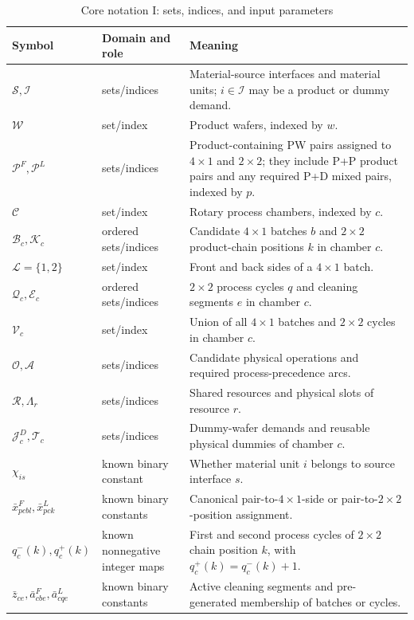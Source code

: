 \documentclass[final,5p,times,twocolumn]{elsarticle}
\begin{document}
\begin{table}[t]
\centering
\scriptsize
\setlength{\tabcolsep}{2.5pt}
\caption{Core notation I: sets, indices, and input parameters}
\label{tab:symbol-en-a}
\begin{tabular}{p{}p{}p{}}
\toprule
Symbol & Domain and role & Meaning \\
\midrule
$\mathcal S,\mathcal I$ & sets/indices & Material-source interfaces and material units; $i\in\mathcal I$ may be a product or dummy demand.\\
$\mathcal W$ & set/index & Product wafers, indexed by $w$.\\
$\mathcal P^F,\mathcal P^L$ & sets/indices & Product-containing PW pairs assigned to $4\times1$ and $2\times2$; they include P+P product pairs and any required P+D mixed pairs, indexed by $p$.\\
$\mathcal C$ & set/index & Rotary process chambers, indexed by $c$.\\
$\mathcal B_c,\mathcal K_c$ & ordered sets/indices & Candidate $4\times1$ batches $b$ and $2\times2$ product-chain positions $k$ in chamber $c$.\\
$\mathcal L=\{1,2\}$ & set/index & Front and back sides of a $4\times1$ batch.\\
$\mathcal Q_c,\mathcal E_c$ & ordered sets/indices & $2\times2$ process cycles $q$ and cleaning segments $e$ in chamber $c$.\\
$\mathcal V_c$ & set/index & Union of all $4\times1$ batches and $2\times2$ cycles in chamber $c$.\\
$\mathcal O,\mathcal A$ & sets/indices & Candidate physical operations and required process-precedence arcs.\\
$\mathcal R,\Lambda_r$ & sets/indices & Shared resources and physical slots of resource $r$.\\
$\mathcal J_c^D,\mathcal T_c$ & sets/indices & Dummy-wafer demands and reusable physical dummies of chamber $c$.\\
$\chi_{is}$ & known binary constant & Whether material unit $i$ belongs to source interface $s$.\\
$\bar x^F_{pcbl},\bar x^L_{pck}$ & known binary constants & Canonical pair-to-$4\times1$-side or pair-to-$2\times2$-position assignment.\\
$q_c^-(k),q_c^+(k)$ & known nonnegative integer maps & First and second process cycles of $2\times2$ chain position $k$, with $q_c^+(k)=q_c^-(k)+1$.\\
$\bar z_{ce},\bar a^F_{cbe},\bar a^L_{cqe}$ & known binary constants & Active cleaning segments and pre-generated membership of batches or cycles.\\

\end{tabular}
\end{table}
\end{document}
